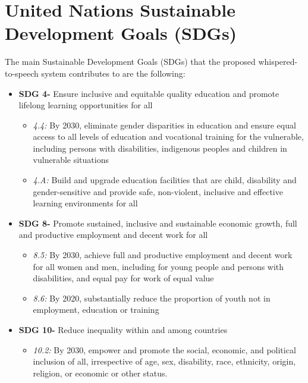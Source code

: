 \chapter*{United Nations Sustainable Development Goals (SDGs)}

The main Sustainable Development Goals (SDGs) that the proposed whispered-to-speech system contributes to are the following:

\begin{itemize}[leftmargin=*, itemsep=1pt, parsep=1pt]
    \item {\bf SDG 4-} Ensure inclusive and equitable quality education and promote lifelong learning opportunities for all
        \begin{itemize}[leftmargin=*, itemsep=1pt, parsep=1pt]
            \item {\it 4.4:} By 2030, eliminate gender disparities in education and ensure equal access to all levels of education and vocational training for the vulnerable, including persons with disabilities, indigenous peoples and children in vulnerable situations
            \item {\it 4.A:} Build and upgrade education facilities that are child, disability and gender-sensitive and provide safe, non-violent, inclusive and effective learning environments for all
        \end{itemize}
    \item {\bf SDG 8-} Promote sustained, inclusive and sustainable economic growth, full and productive employment and decent work for all
        \begin{itemize}[leftmargin=*, itemsep=1pt, parsep=1pt]
            \item {\it 8.5:} By 2030, achieve full and productive employment and decent work for all women and men, including for young people and persons with disabilities, and equal pay for work of equal value
            \item {\it 8.6:} By 2020, substantially reduce the proportion of youth not in employment, education or training
        \end{itemize}
    \item {\bf SDG 10-} Reduce inequality within and among countries
        \begin{itemize}[leftmargin=*, itemsep=1pt, parsep=1pt]
            \item {\it 10.2:} By 2030, empower and promote the social, economic, and political inclusion of all, irrespective of age, sex, disability, race, ethnicity, origin, religion, or economic or other status.

\end{itemize}
\end{itemize}
